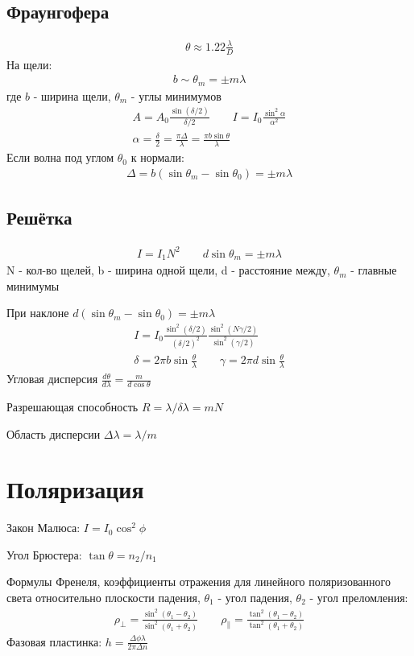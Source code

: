 \documentclass[10pt,twocolumn]{article}
\begin{document}
\subsection{Фраунгофера}
\begin{gather*}
  \theta \approx 1.22 \frac{\lambda}{D}
\end{gather*}
На щели:
\begin{gather*}
  b\sim \theta_m = \pm m \lambda
\end{gather*}
где $b$ - ширина щели, $\theta_m$ - углы минимумов
\begin{gather*}
  A=A_0\frac{\sin(\delta/2)}{\delta/2} \qquad I=I_0 \frac{\sin^{2}\alpha}{\alpha^{2}} \\ 
  \alpha = \frac{\delta}{2} = \frac{\pi \Delta}{\lambda} = \frac{\pi b \sin \theta}{\lambda}
\end{gather*}
Если волна под углом $\theta_0$ к нормали:
\begin{gather*}
  \Delta = b (\sin \theta_m - \sin \theta_0) = \pm m \lambda 
\end{gather*}
\subsection{Решётка}
\begin{gather*}
  I=I_1N^{2} \qquad d\sin \theta_m = \pm m \lambda
\end{gather*}
N - кол-во щелей, b - ширина одной щели, d - расстояние между, $\theta_m$ - главные минимумы

При наклоне $d(\sin \theta_m - \sin \theta_0)=\pm m \lambda$
\begin{gather*}
  I=I_0 \frac{\sin^{2}(\delta/2)}{(\delta/2)^{2}} \frac{\sin^{2}(N\gamma/2)}{\sin^{2}(\gamma/2)} \\ 
  \delta = 2\pi b \sin \frac{\theta}{\lambda} \qquad \gamma = 2 \pi d \sin \frac{\theta}{\lambda}
\end{gather*}
Угловая дисперсия $\frac{d\theta}{d\lambda}=\frac{m}{d\cos \theta}$

Разрешающая способность $R=\lambda/\delta \lambda = m N$

Область дисперсии $\Delta \lambda = \lambda / m$
\section{Поляризация}
Закон Малюса: $I=I_0\cos^{2}\phi$

Угол Брюстера: $\tan \theta=n_2/n_1$

Формулы Френеля, коэффициенты отражения для линейного поляризованного света 
относительно плоскости падения, $\theta_1$ - угол падения, $\theta_2$ - угол преломления:
\begin{gather*}
  \rho_{\perp}=\frac{\sin^{2}(\theta_1-\theta_2)}{\sin^{2}(\theta_1+\theta_2)} \qquad \rho_{\parallel}=\frac{\tan^{2}(\theta_1-\theta_2)}{\tan^{2}(\theta_1+\theta_2)}
\end{gather*}
Фазовая пластинка: $h = \frac{\Delta \phi \lambda}{2\pi \Delta n}$
\end{document}
